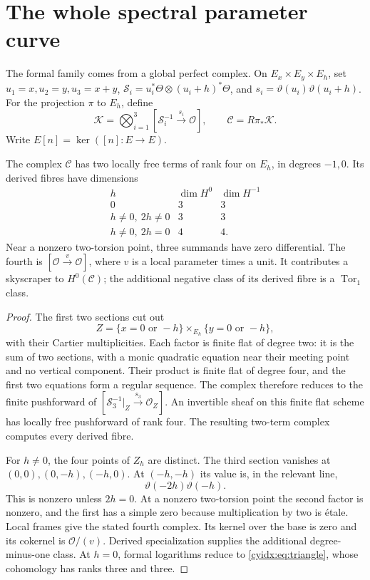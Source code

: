 \section{The whole spectral parameter curve}
\label{cyidx:sec:global-shift}

The formal family comes from a global perfect complex.
On \(E_x\times E_y\times E_h\), set
\(u_1=x,u_2=y,u_3=x+y\),
\(\mathcal S_i=u_i^*\Theta\otimes(u_i+h)^*\Theta\),
and \(s_i=\vartheta(u_i)\vartheta(u_i+h)\).
For the projection \(\pi\) to \(E_h\), define
\begin{equation}\label{cyidx:eq:global-shift}
 \mathscr K=\bigotimes_{i=1}^3
      [\mathcal S_i^{-1}\xrightarrow{s_i}\mathcal O],
                      \qquad \mathscr C=R\pi_*\mathscr K.
\end{equation}
Write \(E[n]=\ker([n]:E\to E)\).

\begin{theorem}\label{cyidx:thm:global-fibres}
The complex \(\mathscr C\) has two locally free terms
of rank four on \(E_h\), in degrees \(-1,0\).
Its derived fibres have dimensions
\[
\begin{array}{c|cc}
 h&\dim H^0&\dim H^{-1}\\\hline
 0&3&3\\
 h\ne0,\ 2h\ne0&3&3\\
 h\ne0,\ 2h=0&4&4.
\end{array}
\]
Near a nonzero two-torsion point, three summands have
zero differential. The fourth is
\([\mathcal O\xrightarrow{v}\mathcal O]\), where
\(v\) is a local parameter times a unit. It contributes
a skyscraper to \(H^0(\mathscr C)\); the additional
negative class of its derived fibre is a
\(\operatorname{Tor}_1\) class.
\end{theorem}
\begin{proof}
The first two sections cut out
\[
 Z=\{x=0\text{ or }-h\}\times_{E_h}
                 \{y=0\text{ or }-h\},
\]
with their Cartier multiplicities. Each factor is
finite flat of degree two: it is the sum of two
sections, with a monic quadratic equation near their
meeting point and no vertical component. Their
product is finite flat of degree four, and the first
two equations form a regular sequence. The complex
therefore reduces to the finite pushforward of
\([\mathcal S_3^{-1}|_Z\xrightarrow{s_3}\mathcal O_Z]\).
An invertible sheaf on this finite flat scheme has
locally free pushforward of rank four. The resulting
two-term complex computes every derived fibre.

For \(h\ne0\), the four points of \(Z_h\) are
distinct. The third section vanishes at
\((0,0),(0,-h),(-h,0)\). At \((-h,-h)\) its value
is, in the relevant line,
\[
                    \vartheta(-2h)\vartheta(-h).
\]
This is nonzero unless \(2h=0\). At a nonzero
two-torsion point the second factor is nonzero, and
the first has a simple zero because multiplication
by two is étale. Local frames give the
stated fourth complex. Its kernel over the base is
zero and its cokernel is \(\mathcal O/(v)\).
Derived specialization supplies the additional
degree-minus-one class. At \(h=0\), formal logarithms
reduce to \eqref{cyidx:eq:triangle}, whose cohomology
has ranks three and three.
\end{proof}

